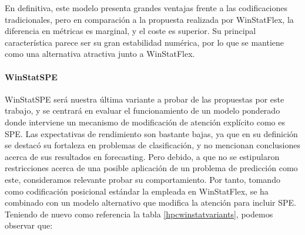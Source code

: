 En definitiva, este modelo presenta grandes ventajas frente a las codificaciones tradicionales, pero en comparación a la propuesta realizada por WinStatFlex, la diferencia en métricas es marginal, y el coste es superior. Su principal característica parece ser su gran estabilidad numérica, por lo que se mantiene como una alternativa atractiva junto a WinStatFlex.

\paragraph{WinStatSPE}

WinStatSPE será nuestra última variante a probar de las propuestas por este trabajo, y se centrará en evaluar el funcionamiento de un modelo ponderado donde interviene un mecanismo de modificación de atención explícito como es SPE. Las expectativas de rendimiento son bastante bajas, ya que en su definición se destacó su fortaleza en problemas de clasificación, y no mencionan conclusiones acerca de sus resultados en forecasting. Pero debido, a que no se estipularon restricciones acerca de una posible aplicación de un problema de predicción como este, consideramos relevante probar su comportamiento. Por tanto, tomando como codificación posicional estándar la empleada en WinStatFlex, se ha combinado con un modelo alternativo que modifica la atención para incluir SPE. Teniendo de nuevo como referencia la tabla \ref{hpcwinstatvariants}, podemos observar que:

